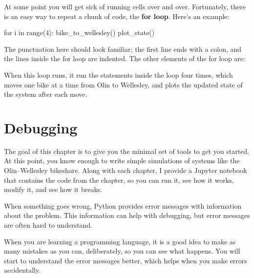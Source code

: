 \documentclass[12pt]{book}
\theoremstyle{exercise}
\newcommand{\py}{\verb}%}
\begin{document}
At some point you will get sick of running cells over and over. Fortunately, there is an easy way to repeat a chunk of code, the {\bf for loop}.  Here's an example:

\begin{python}
for i in range(4):
    bike_to_wellesley()
    plot_state()
\end{python}

The punctuation here should look familiar; the first line ends with a colon, and the lines inside the for loop are indented.  The other elements of the for loop are:


When this loop runs, it run the statements inside the loop four times, 
which moves one bike at a time from Olin to Wellesley, and plots the updated state of the system after each move.


\section{Debugging}

The goal of this chapter is to give you the minimal set of tools to get you started.  At this point, you know enough to write simple simulations of systems like the Olin--Wellesley bikeshare.  Along with each chapter, I provide a Jupyter notebook that contains the code from the chapter, so you can run it, see how it works, modify it, and see how it breaks.

When something goes wrong, Python provides error messages with information about the problem.  This information can help with debugging, but error messages are often hard to understand.

When you are learning a programming language, it is a good idea to make as many mistakes as you can, deliberately, so you can see what happens.  You will start to understand the error messages better, which helps when you make errors accidentally.
\end{document}
